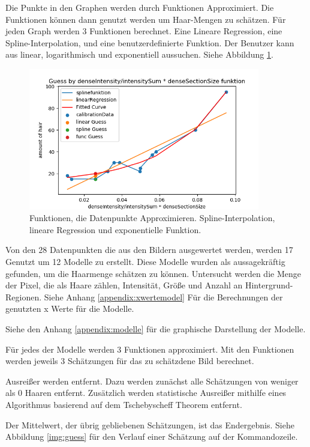 \documentclass[german,a4paper, 12pt]{llncs}
\begin{document}
Die Punkte in den Graphen werden durch Funktionen Approximiert. Die Funktionen können dann genutzt werden um Haar-Mengen zu schätzen.
Für jeden Graph werden 3 Funktionen berechnet. Eine Lineare Regression, eine Spline-Interpolation, und eine benutzerdefinierte Funktion.
Der Benutzer kann aus linear, logarithmisch und exponentiell aussuchen.
Siehe Abbildung \ref{fig:func}.

\begin{figure}
	\centering
	\includegraphics[width=0.9\textwidth]{fig64/g11_denseIntensitynormDetailed.png}
	\caption[]{Funktionen, die Datenpunkte Approximieren. Spline-Interpolation, lineare Regression und exponentielle Funktion.}
	\label{fig:func}
\end{figure} 

Von den 28 Datenpunkten die aus den Bildern ausgewertet werden, werden 17 Genutzt um 12 Modelle zu erstellt. Diese Modelle wurden als aussagekräftig gefunden, um die Haarmenge schätzen zu können. Untersucht werden die Menge der Pixel, die als Haare zählen, Intensität, Größe und Anzahl an Hintergrund-Regionen. Siehe Anhang \ref{appendix:xwertemodel} Für die Berechnungen der genutzten x Werte für die Modelle. 

Siehe den Anhang \ref{appendix:modelle} für die graphische Darstellung der Modelle.

Für jedes der Modelle werden 3 Funktionen approximiert. Mit den Funktionen werden jeweils 3 Schätzungen für das zu schätzdene Bild berechnet. 

Ausreißer werden entfernt. Dazu werden zunächst alle Schätzungen von weniger als 0 Haaren entfernt. Zusätzlich werden statistische Ausreißer mithilfe eines Algorithmus basierend auf dem Tschebyscheff Theorem entfernt.\cite{outlierRemoval}

Der Mittelwert, der übrig gebliebenen Schätzungen, ist das Endergebnis. 
Siehe Abbildung \ref{img:guess} für den Verlauf einer Schätzung auf der Kommandozeile.
\end{document}
